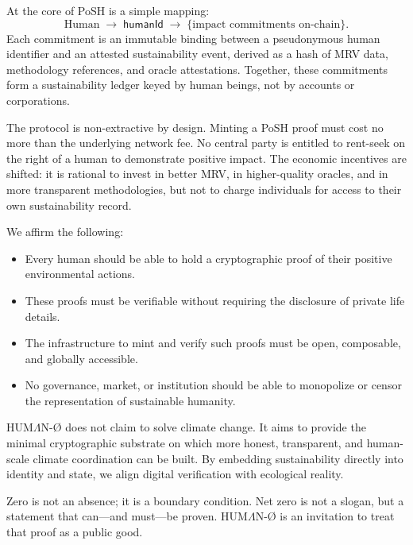 \documentclass[11pt,a4paper]{report}
\theoremstyle{definition}
\theoremstyle{remark}
\begin{document}
At the core of PoSH is a simple mapping:
\[
  \text{Human} \;\rightarrow\; \mathsf{humanId} \;\rightarrow\;
  \{\text{impact commitments on-chain}\}.
\]
Each commitment is an immutable binding between a pseudonymous human identifier
and an attested sustainability event, derived as a hash of MRV data, methodology
references, and oracle attestations. Together, these commitments form a
sustainability ledger keyed by human beings, not by accounts or corporations.

The protocol is non-extractive by design. Minting a PoSH proof must cost no more
than the underlying network fee. No central party is entitled to rent-seek on
the right of a human to demonstrate positive impact. The economic incentives are
shifted: it is rational to invest in better MRV, in higher-quality oracles, and
in more transparent methodologies, but not to charge individuals for access to
their own sustainability record.

We affirm the following:

\begin{itemize}[leftmargin=*]
  \item Every human should be able to hold a cryptographic proof of their
        positive environmental actions.
  \item These proofs must be verifiable without requiring the disclosure of
        private life details.
  \item The infrastructure to mint and verify such proofs must be open,
        composable, and globally accessible.
  \item No governance, market, or institution should be able to monopolize or
        censor the representation of sustainable humanity.
\end{itemize}

HUM{\Large$\Lambda$}N-Ø does not claim to solve climate change. It aims to
provide the minimal cryptographic substrate on which more honest, transparent,
and human-scale climate coordination can be built. By embedding sustainability
directly into identity and state, we align digital verification with ecological
reality.

Zero is not an absence; it is a boundary condition. Net zero is not a slogan,
but a statement that can---and must---be proven. HUM{\Large$\Lambda$}N-Ø is an
invitation to treat that proof as a public good.

\clearpage

\end{document}
